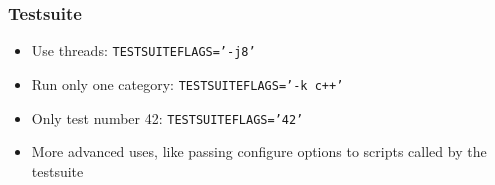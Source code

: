 \documentclass{beamer}
\begin{document}
\begin{frame}
  \frametitle{Testsuite}
    \begin{itemize}
      \item Use threads: \texttt{TESTSUITEFLAGS='-j8'}
      \item Run only one category: \texttt{TESTSUITEFLAGS='-k c++'}
      \item Only test number 42: \texttt{TESTSUITEFLAGS='42'}
      \item More advanced uses, like passing configure options to scripts
        called by the testsuite
    \end{itemize}
\end{frame}
\end{document}
